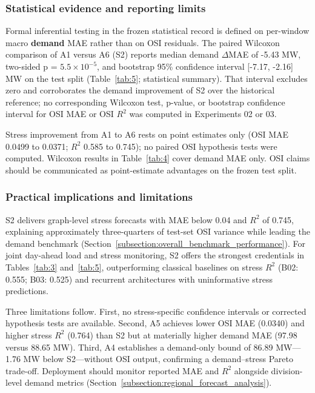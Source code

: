 \subsubsection{Statistical evidence and reporting limits}\label{subsubsection:statistical_evidence_and_reporting_limits}

Formal inferential testing in the frozen statistical record is defined on per-window macro \textbf{demand} MAE rather than on OSI residuals. The paired Wilcoxon comparison of A1 versus A6 (S2) reports median demand $\Delta$MAE of -5.43 MW, two-sided p = $5.5 \times 10^{-5}$, and bootstrap 95\% confidence interval [-7.17, -2.16] MW on the test split (Table~\ref{tab:5}; statistical summary). That interval excludes zero and corroborates the demand improvement of S2 over the historical reference; no corresponding Wilcoxon test, p-value, or bootstrap confidence interval for OSI MAE or OSI $R^2$ was computed in Experiments 02 or 03.

Stress improvement from A1 to A6 rests on point estimates only (OSI MAE 0.0499 to 0.0371; $R^2$ 0.585 to 0.745); no paired OSI hypothesis tests were computed. Wilcoxon results in Table~\ref{tab:4} cover demand MAE only. OSI claims should be communicated as point-estimate advantages on the frozen test split.

\subsubsection{Practical implications and limitations}\label{subsubsection:practical_implications_and_limitations}

S2 delivers graph-level stress forecasts with MAE below 0.04 and $R^2$ of 0.745, explaining approximately three-quarters of test-set OSI variance while leading the demand benchmark (Section~\ref{subsection:overall_benchmark_performance}). For joint day-ahead load and stress monitoring, S2 offers the strongest credentials in Tables~\ref{tab:3} and~\ref{tab:5}, outperforming classical baselines on stress $R^2$ (B02: 0.555; B03: 0.525) and recurrent architectures with uninformative stress predictions.

Three limitations follow. First, no stress-specific confidence intervals or corrected hypothesis tests are available. Second, A5 achieves lower OSI MAE (0.0340) and higher stress $R^2$ (0.764) than S2 but at materially higher demand MAE (97.98 versus 88.65 MW). Third, A4 establishes a demand-only bound of 86.89 MW---1.76 MW below S2---without OSI output, confirming a demand--stress Pareto trade-off. Deployment should monitor reported MAE and $R^2$ alongside division-level demand metrics (Section~\ref{subsection:regional_forecast_analysis}).


